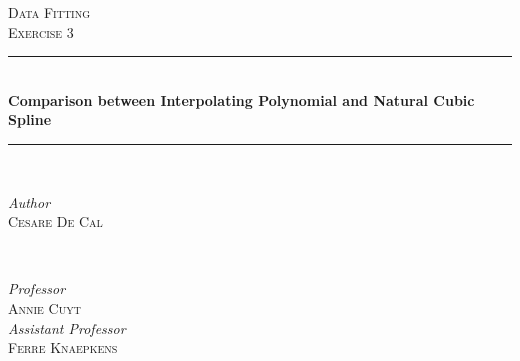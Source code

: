 \documentclass{article}
\begin{document}

\begin{titlepage} %
	\newcommand{\HRule}{\rule{\linewidth}{0.5mm}}%
	
	\center %
	
	
	\textsc{\Large Data Fitting}\\[0.5cm] %
	
	\textsc{\large Exercise 3}\\[0.5cm] %
	
	
	\HRule\\[0.6cm]
	
	{\huge\bfseries Comparison between Interpolating Polynomial and Natural Cubic Spline}\\[0.25cm] %
	
	\HRule\\[1.5cm]
	
	
	\begin{minipage}{0.4\textwidth}
		\begin{flushleft}
			\large
			\textit{Author}\\
			\textsc{Cesare De Cal} %
		\end{flushleft}
	\end{minipage}
	~
	\begin{minipage}{0.4\textwidth}
		\begin{flushright}
			\large
			\textit{Professor}\\
			\textsc{Annie Cuyt}\\ %
			[0.25cm]
			\textit{Assistant Professor}\\
			\textsc{Ferre Knaepkens} %


\end{flushright}
\end{minipage}
\end{titlepage}
\end{document}
